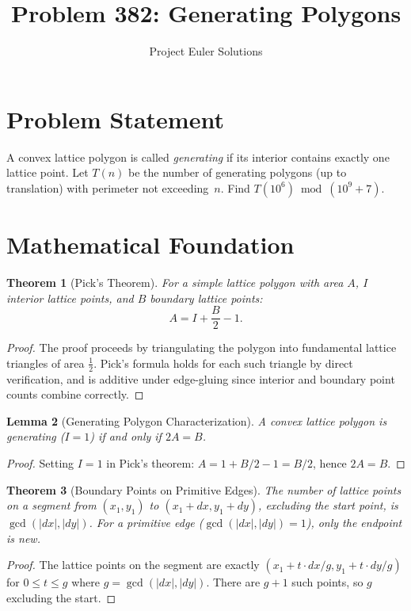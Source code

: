 \documentclass[11pt]{article}
\title{Problem 382: Generating Polygons}
\author{Project Euler Solutions}
\date{}
\newtheorem{theorem}{Theorem}
\newtheorem{lemma}[theorem]{Lemma}
\begin{document}
\maketitle

\section{Problem Statement}

A convex lattice polygon is called \emph{generating} if its interior contains exactly one lattice point. Let $T(n)$ be the number of generating polygons (up to translation) with perimeter not exceeding~$n$. Find $T(10^6) \bmod (10^9 + 7)$.

\section{Mathematical Foundation}

\begin{theorem}[Pick's Theorem]
For a simple lattice polygon with area $A$, $I$ interior lattice points, and $B$ boundary lattice points:
\[
A = I + \frac{B}{2} - 1.
\]
\end{theorem}

\begin{proof}
The proof proceeds by triangulating the polygon into fundamental lattice triangles of area $\tfrac{1}{2}$. Pick's formula holds for each such triangle by direct verification, and is additive under edge-gluing since interior and boundary point counts combine correctly.
\end{proof}

\begin{lemma}[Generating Polygon Characterization]
A convex lattice polygon is generating ($I = 1$) if and only if $2A = B$.
\end{lemma}

\begin{proof}
Setting $I = 1$ in Pick's theorem: $A = 1 + B/2 - 1 = B/2$, hence $2A = B$.
\end{proof}

\begin{theorem}[Boundary Points on Primitive Edges]
The number of lattice points on a segment from $(x_1, y_1)$ to $(x_1 + dx, y_1 + dy)$, excluding the start point, is $\gcd(|dx|, |dy|)$. For a primitive edge ($\gcd(|dx|,|dy|) = 1$), only the endpoint is new.
\end{theorem}

\begin{proof}
The lattice points on the segment are exactly $(x_1 + t \cdot dx/g, y_1 + t \cdot dy/g)$ for $0 \le t \le g$ where $g = \gcd(|dx|, |dy|)$. There are $g + 1$ such points, so $g$ excluding the start.
\end{proof}
\end{document}
